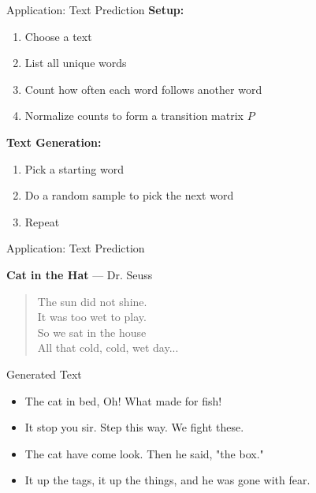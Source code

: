\documentclass[10pt]{beamer}
\begin{document}
\begin{frame}{Application: Text Prediction}
\textbf{Setup:}
\begin{enumerate}
    \item Choose a text
    \item List all unique words
    \item Count how often each word follows another word
    \item Normalize counts to form a transition matrix $P$
\end{enumerate}
\vfill
\textbf{Text Generation:}
\begin{enumerate}
    \item Pick a starting word
    \item Do a random sample to pick the next word
    \item Repeat
\end{enumerate}
    
\end{frame}

\begin{frame}{Application: Text Prediction}
\begin{example}
\textbf{Cat in the Hat} --- Dr. Seuss

\begin{verse}
The sun did not shine.\\
It was too wet to play.\\
So we sat in the house\\
All that cold, cold, wet day...
\end{verse}
\end{example}
\vfill

 \begin{block}{Generated Text}
 \ttfamily
    \begin{itemize}
        \item The cat in bed, Oh! What made for fish! 
        \item It stop you sir. Step this way. We fight these.
        \item The cat have come look. Then he said, "the box."
        \item It up the tags, it up the things, and he was gone with fear.
    \end{itemize}
 \end{block}
    
\end{frame}


\end{document}
